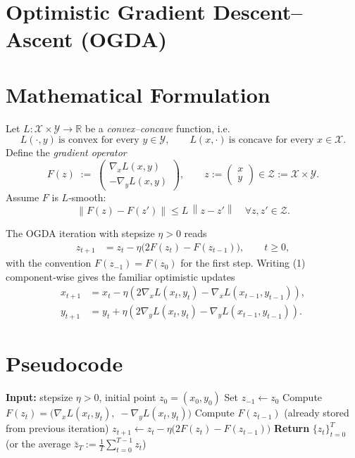 \documentclass{article}
\newcommand{\norm}[1]{\left\lVert#1\right\rVert}
\newcommand{\R}{\mathbb{R}}
\begin{document}
\section*{Optimistic Gradient Descent–Ascent (OGDA)}

\section*{Mathematical Formulation}
Let $L:\mathcal X\times\mathcal Y\rightarrow\R$ be a \emph{convex--concave} function, i.e.
\[
L(\cdot ,y)\ \text{is convex for every }y\in\mathcal Y,\qquad
L(x,\cdot )\ \text{is concave for every }x\in\mathcal X .
\]
Define the \emph{gradient operator}
\[
F(z)\;:=\;\begin{pmatrix}
\nabla_x L(x,y)\\[2mm]
-\nabla_y L(x,y)
\end{pmatrix},
\qquad 
z:=\begin{pmatrix}x\\y\end{pmatrix}\in\mathcal Z:=\mathcal X\times\mathcal Y .
\]
Assume $F$ is $L$‑smooth:
\[
\norm{F(z)-F(z')}\le L\,\norm{z-z'}\quad\forall z,z'\in\mathcal Z .
\]

The OGDA iteration with stepsize $\eta>0$ reads
\[
\boxed{
\begin{aligned}
z_{t+1}&=z_t-\eta\bigl(2F(z_t)-F(z_{t-1})\bigr),\qquad t\ge 0,
\end{aligned}}
\tag{1}
\]
with the convention $F(z_{-1})=F(z_{0})$ for the first step.
Writing (1) component‑wise gives the familiar optimistic updates
\[
\begin{aligned}
x_{t+1}&=x_t-\eta\!\left(2\nabla_x L(x_t,y_t)-\nabla_x L(x_{t-1},y_{t-1})\right),\\
y_{t+1}&=y_t+\eta\!\left(2\nabla_y L(x_t,y_t)-\nabla_y L(x_{t-1},y_{t-1})\right).
\end{aligned}
\tag{2}
\]

\section*{Pseudocode}
\begin{algorithm}[H]
\caption{Optimistic Gradient Descent–Ascent (OGDA)}
\begin{algorithmic}[1]
\State \textbf{Input:} stepsize $\eta>0$, initial point $z_0=(x_0,y_0)$
\State Set $z_{-1}\gets z_0$   
    \State Compute $F(z_t)=\bigl(\nabla_x L(x_t,y_t),\;-\nabla_y L(x_t,y_t)\bigr)$
    \State Compute $F(z_{t-1})$ (already stored from previous iteration)
    \State $z_{t+1}\gets z_t-\eta\bigl(2F(z_t)-F(z_{t-1})\bigr)$
\EndFor
\State \textbf{Return} $\{z_t\}_{t=0}^{T}$ (or the average $\bar z_T:=\frac1T\sum_{t=0}^{T-1}z_t$)
\end{algorithmic}
\end{algorithm}
\end{document}
